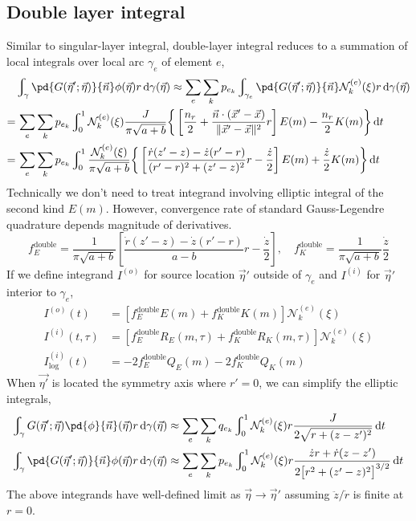 \documentclass{jfm}
\begin{document}
\subsection{Double layer integral}
Similar to singular-layer integral, double-layer integral reduces to a summation of local integrals over local arc $\gamma_e$ of element $e$,
\begin{align}
&\nonumber\int_{\gamma}\pd{G(\vec{\eta}';\vec{\eta})}{\vec{n}}\phi(\vec{\eta}) r \,\mathrm{d}\gamma(\vec{\eta})
\approx\sum_e \sum_k p_{e_k}
\int_{\gamma_e}\pd{G(\vec{\eta}';\vec{\eta})}{\vec{n}}\mathcal{N}^{(e)}_k(\xi) r \,\mathrm{d}\gamma(\vec{\eta})\\
=&\nonumber\,\sum_e \sum_k p_{e_k}
\int_0^1\mathcal{N}^{(e)}_k(\xi)
\frac{J}{\pi \sqrt{a+b}}\bigg\{
\left[\frac{n_r}{2}+\frac{\vec{n}\cdot(\vec{x}'-\vec{x})}{\|\vec{x}'-\vec{x}\|^2}r\right]E(m)
-\frac{n_r}{2}K(m)\bigg\}
\,\mathrm{d}t\\
=&\,\sum_e \sum_k p_{e_k}
\int_0^1
\frac{\mathcal{N}^{(e)}_k(\xi)}{\pi \sqrt{a+b}}\bigg\{
\left[\frac{\dot{r}(z'-z)-\dot{z}(r'-r)}{(r'-r)^2+(z'-z)^2}r
-\frac{\dot{z}}{2}\right]E(m)
+\frac{\dot{z}}{2}K(m)\bigg\}
\,\mathrm{d}t
\end{align}
Technically we don't need to treat integrand involving elliptic integral of the second kind $E(m)$.
However, convergence rate of standard Gauss-Legendre quadrature  depends magnitude of derivatives.
\begin{equation}
f_E^\mathrm{double}=\frac{1}{\pi \sqrt{a+b}}
\left[\frac{\dot{r}(z'-z)-\dot{z}(r'-r)}{a-b}r
-\frac{\dot{z}}{2}\right],\quad
f_K^\mathrm{double}=\frac{1}{\pi \sqrt{a+b}}
\frac{\dot{z}}{2}
\end{equation}
If we define integrand $I^{(o)}$ for source location $\vec{\eta}'$ outside of $\gamma_e$
and $I^{(i)}$ for $\vec{\eta}'$ interior to $\gamma_e$,
\begin{align}
I^{(o)}(t) &= \left[ f_E^\mathrm{double} E(m)+f_K^\mathrm{double} K(m)\right]\mathcal{N}^{(e)}_k(\xi)\\
I^{(i)}(t,\tau) &= \left[f_E^\mathrm{double}R_E(m,\tau)+ f_K^\mathrm{double}R_K(m,\tau)\right]\mathcal{N}^{(e)}_k(\xi)\\
I^{(i)}_\mathrm{log}(t) &=-2 f_E^\mathrm{double}Q_E(m) -2 f_K^\mathrm{double}Q_K(m) 
\end{align}
When $\vec{\eta'}$ is located the symmetry axis where $r'=0$,
we can simplify the elliptic integrals,
\begin{align}
\int_{\gamma}G(\vec{\eta}';\vec{\eta})
\pd{\phi}{\vec{n}}(\vec{\eta}) r \,\mathrm{d}\gamma(\vec{\eta})
&\approx\sum_e \sum_k q_{e_k}
\int_0^1\mathcal{N}^{(e)}_k(\xi)r\frac{   J }{
2 \sqrt{r+(z-z')^2}}\,\mathrm{d}t\\
\int_{\gamma}\pd{G(\vec{\eta}';\vec{\eta})}{\vec{n}}\phi(\vec{\eta}) r \,\mathrm{d}\gamma(\vec{\eta})
&\approx\sum_e \sum_k p_{e_k}
\int_0^1\mathcal{N}^{(e)}_k(\xi)r \frac{  
\dot{z}r+\dot{r}(z-z')
}{
2\big[r^2+(z'-z)^2\big]^{3/2}
}\,\mathrm{d}t
\end{align}
The above integrands have well-defined limit as $\vec{\eta}\to\vec{\eta}'$
assuming $\ddot{z}/\dot{r}$ is finite at $r=0$.
\end{document}
